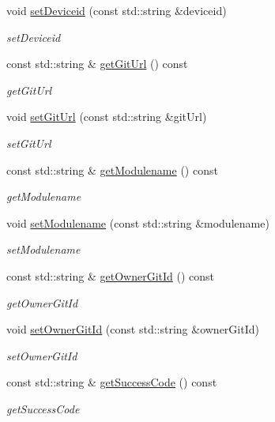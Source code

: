 \begin{DoxyCompactItemize}
void \hyperlink{classDevice_a8bd16b3e099e864db3c09ba4f6225fb0}{set\+Deviceid} (const std\+::string \&deviceid)
\begin{DoxyCompactList}\small\item\em set\+Deviceid \end{DoxyCompactList}\item 
const std\+::string \& \hyperlink{classDevice_a96f94097331f294afc73c6358918d408}{get\+Git\+Url} () const
\begin{DoxyCompactList}\small\item\em get\+Git\+Url \end{DoxyCompactList}\item 
void \hyperlink{classDevice_ae8587aa062a7a2f2b5b77e9a15569e53}{set\+Git\+Url} (const std\+::string \&git\+Url)
\begin{DoxyCompactList}\small\item\em set\+Git\+Url \end{DoxyCompactList}\item 
const std\+::string \& \hyperlink{classDevice_a77eeec87fea2ffc4d4140b315613bb1b}{get\+Modulename} () const
\begin{DoxyCompactList}\small\item\em get\+Modulename \end{DoxyCompactList}\item 
void \hyperlink{classDevice_a09e9d9bbcfa76268b7ebc30afa680c69}{set\+Modulename} (const std\+::string \&modulename)
\begin{DoxyCompactList}\small\item\em set\+Modulename \end{DoxyCompactList}\item 
const std\+::string \& \hyperlink{classDevice_a2b4556e5a3b1f955c3e498e1de75051c}{get\+Owner\+Git\+Id} () const
\begin{DoxyCompactList}\small\item\em get\+Owner\+Git\+Id \end{DoxyCompactList}\item 
void \hyperlink{classDevice_aabc16749d0fe22ec25ca525fbd2b9dc2}{set\+Owner\+Git\+Id} (const std\+::string \&owner\+Git\+Id)
\begin{DoxyCompactList}\small\item\em set\+Owner\+Git\+Id \end{DoxyCompactList}\item 
const std\+::string \& \hyperlink{classDevice_a19c62e8fa746efc12e6c0521b690bf03}{get\+Success\+Code} () const
\begin{DoxyCompactList}\small\item\em get\+Success\+Code \end{DoxyCompactList}\item 

\end{DoxyCompactItemize}
